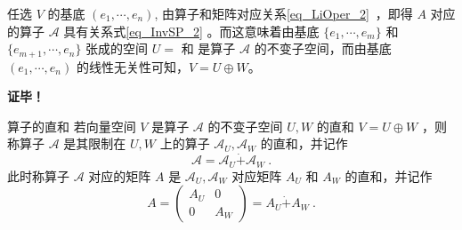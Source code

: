 任选 $V$ 的基底 $(e_1,\cdots, e_n)$, 由算子和矩阵对应关系\autoref{eq_LiOper_2}~，即得 $A$ 对应的算子 $\mathcal{A}$ 具有关系式\autoref{eq_InvSP_2} 。而这意味着由基底 $\{e_1 ,\cdots, e_m\}$ 和 $\{e_{m+1}, \cdots, e_n\}$ 张成的空间 $U=$ 和 是算子 $\mathcal{A}$ 的不变子空间，而由基底 $(e_1,\cdots, e_n)$ 的线性无关性可知，$V=U\oplus W$。

\textbf{证毕！}


\begin{definition}{算子的直和}
若向量空间 $V$ 是算子 $\mathcal{A}$ 的不变子空间 $U,W$ 的直和 $V=U\oplus W$ ，则称算子 $\mathcal{A}$ 是其限制在 $U,W$ 上的算子 $\mathcal{A}_U,\mathcal{A}_W$ 的直和，并记作
\begin{equation}
\mathcal{A}=\mathcal{A}_U\dot{+}\mathcal{A}_W~.
\end{equation}
此时称算子 $\mathcal{A}$ 对应的矩阵 $A$ 是 $\mathcal{A}_U,\mathcal{A}_W$ 对应矩阵 $A_U$ 和 $A_W$ 的直和，并记作
\begin{equation}
A=\begin{pmatrix}
A_U&0\\
0&A_W
\end{pmatrix}=A_U\dot{+}A_W~.
\end{equation}

\end{definition}
